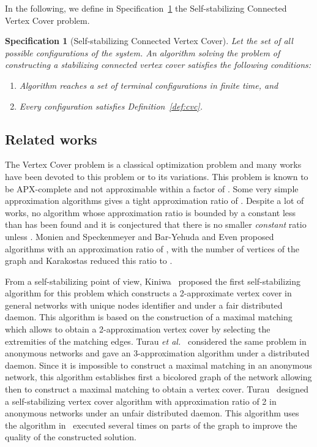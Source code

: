 \documentclass[11pt,letterpaper,onecolumn]{article}
\newtheorem{spec}{Specification}
\begin{document}
In the following, we define in Specification~\ref{spec:cvc} the Self-stabilizing Connected Vertex Cover problem.

\begin{spec}[Self-stabilizing Connected Vertex Cover]
\label{spec:cvc}
Let  the set of all possible configurations of the system. An algorithm  solving the problem of constructing a stabilizing connected vertex cover satisfies the following conditions:
\begin{enumerate}
\item Algorithm  reaches a set of terminal configurations  in finite time, and
\item Every configuration  satisfies Definition~\ref{def:cvc}.
\end{enumerate}
\end{spec}

\subsection{Related works}

The Vertex Cover problem is a classical optimization problem and many works have been devoted to this problem or to its variations. This problem is known to be APX-complete \cite{PapadimitriouY88} and not approximable within a factor of  \cite{DinurS05}. Some very simple approximation algorithms gives a tight approximation ratio of  \cite{GJ79,Vaz01,Savage82}. Despite a lot of works, no algorithm whose approximation ratio is bounded by a constant less than  has been found and it is conjectured that there is no smaller \emph{constant} ratio unless  \cite{KhotR08}. Monien and Speckenmeyer \cite{Monien1985} and Bar-Yehuda and Even \cite{Bar-YehudaE85} proposed algorithms with an approximation ratio of , with  the number of vertices of the graph and Karakostas \cite{Karakostas05} reduced this ratio to .

From a self-stabilizing point of view, Kiniwa~\cite{Kiniwa05} proposed the first self-stabilizing algorithm for this problem which constructs a 2-approximate vertex cover in general networks with unique nodes identifier and under a fair distributed daemon. This algorithm is based on the construction of a maximal matching which allows to obtain a 2-approximation vertex cover by selecting the extremities of the matching edges. Turau \emph{et al.}~\cite{TurauH11} considered the same problem in anonymous networks and gave an 3-approximation algorithm under a distributed daemon. Since it is impossible to construct a maximal matching in an anonymous network, this algorithm establishes first a bicolored graph of the network allowing then to construct a maximal matching to obtain a vertex cover. Turau~\cite{Turau10} designed a self-stabilizing vertex cover algorithm with approximation ratio of 2 in anonymous networks under an unfair distributed daemon. This algorithm uses the algorithm in~\cite{TurauH11} executed several times on parts of the graph to improve the quality of the constructed solution.
\end{document}
